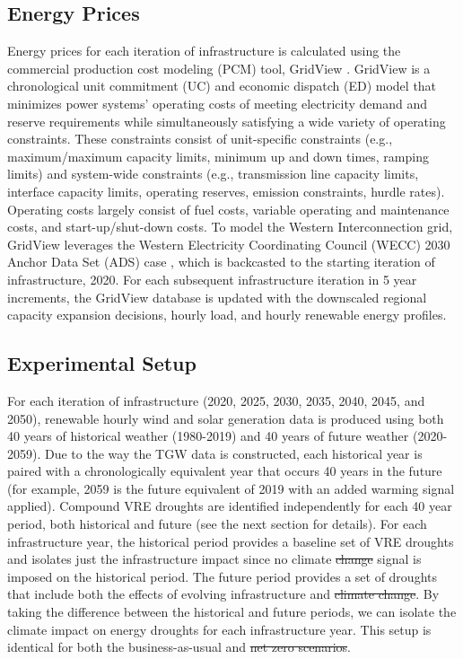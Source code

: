 \documentclass{agujournal2019}
\providecommand{\DIFadd}[1]{{\protect\color{blue}\uwave{#1}}} %
\providecommand{\DIFdel}[1]{{\protect\color{red}\sout{#1}}} %
\providecommand{\DIFaddbegin}{} %
\providecommand{\DIFaddend}{} %
\providecommand{\DIFdelbegin}{} %
\providecommand{\DIFdelend}{} %
\begin{document}
\subsection{Energy Prices}
Energy prices for each iteration of infrastructure is calculated using the commercial production cost modeling (PCM) tool, GridView \cite{hitachi_gridview}. 
GridView is a chronological unit commitment (UC) and economic dispatch (ED) model that minimizes power systems’ operating costs of meeting electricity demand and reserve requirements while simultaneously satisfying a wide variety of operating constraints. These constraints consist of unit-specific constraints (e.g., maximum/maximum capacity limits, minimum up and down times, ramping limits) and system-wide constraints (e.g., transmission line capacity limits, interface capacity limits, operating reserves, emission constraints, hurdle rates). Operating costs largely consist of fuel costs, variable operating and maintenance costs, and start-up/shut-down costs. To model the Western Interconnection grid, GridView leverages the Western Electricity Coordinating Council (WECC) 2030 Anchor Data Set (ADS) case \cite{wecc2021a}, which is backcasted to the starting iteration of infrastructure, 2020. For each subsequent infrastructure iteration in 5 year increments, the GridView database is updated with the downscaled regional capacity expansion decisions, hourly load, and hourly renewable energy profiles.

\subsection{Experimental Setup}

For each iteration of infrastructure (2020, 2025, 2030, 2035, 2040, 2045, and 2050), renewable hourly wind and solar generation data is produced using both 40 years of historical weather (1980-2019) and 40 years of future weather (2020-2059). Due to the way the TGW data is constructed, each historical year is paired with a chronologically equivalent year that occurs 40 years in the future (for example, 2059 is the future equivalent of 2019 with an added warming signal applied). Compound VRE droughts are identified independently for each 40 year period, both historical and future (see the next section for details). For each infrastructure year, the historical period provides a baseline set of VRE droughts and isolates just the infrastructure impact since no climate \DIFdelbegin \DIFdel{change }\DIFdelend signal is imposed on the historical period. The future period provides a set of droughts that include both the effects of evolving infrastructure and \DIFdelbegin \DIFdel{climate change}\DIFdelend \DIFaddbegin \DIFadd{future climate}\DIFaddend . By taking the difference between the historical and future periods, we can isolate the climate impact on energy droughts for each infrastructure year. This setup is identical for both the business-as-usual and \DIFdelbegin \DIFdel{net zero scenarios}\DIFdelend \DIFaddbegin \DIFadd{high renewable scenario}\DIFaddend . 
\end{document}
